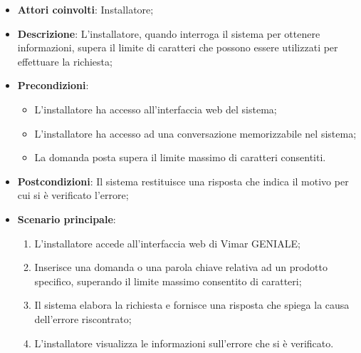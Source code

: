\begin{itemize}
    \item \textbf{Attori coinvolti}: Installatore;
    \item \textbf{Descrizione}: L’installatore, quando interroga il sistema per ottenere informazioni, supera il limite di caratteri che possono essere utilizzati per effettuare la richiesta;
    \item \textbf{Precondizioni}: 
        \begin{itemize}
            \item L’installatore ha accesso all’interfaccia web del sistema;
            \item L’installatore ha accesso ad una conversazione memorizzabile nel sistema;
            \item La domanda posta supera il limite massimo di caratteri consentiti.
        \end{itemize}
    \item \textbf{Postcondizioni}: Il sistema restituisce una risposta che indica il motivo per cui si è verificato l’errore;
    \item \textbf{Scenario principale}:
    \begin{enumerate}
    \item L’installatore accede all’interfaccia web di Vimar GENIALE;
    \item Inserisce una domanda o una parola chiave relativa ad un prodotto specifico, superando il limite massimo consentito di caratteri;
    \item Il sistema elabora la richiesta e fornisce una risposta che spiega la causa dell'errore riscontrato;
    \item L’installatore visualizza le informazioni sull’errore che si è verificato.
    \end{enumerate}
\end{itemize}

